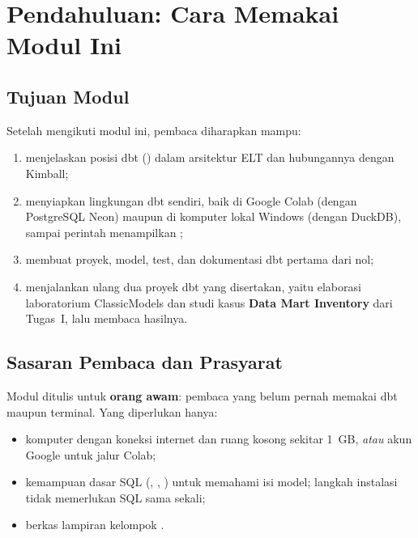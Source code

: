 \chapter*{Pendahuluan: Cara Memakai Modul Ini}

\section*{Tujuan Modul}
Setelah mengikuti modul ini, pembaca diharapkan mampu:
\begin{enumerate}[nosep]
    \item menjelaskan posisi dbt () dalam arsitektur ELT dan hubungannya dengan  Kimball;
    \item menyiapkan lingkungan dbt sendiri, baik di Google Colab (dengan PostgreSQL Neon) maupun di komputer lokal Windows (dengan DuckDB), sampai perintah  menampilkan ;
    \item membuat proyek, model, test, dan dokumentasi dbt pertama dari nol;
    \item menjalankan ulang dua proyek dbt yang disertakan, yaitu elaborasi laboratorium ClassicModels dan studi kasus \textbf{Data Mart Inventory} dari Tugas~I, lalu membaca hasilnya.
\end{enumerate}

\section*{Sasaran Pembaca dan Prasyarat}
Modul ditulis untuk \textbf{orang awam}: pembaca yang belum pernah memakai dbt maupun terminal. Yang diperlukan hanya:
\begin{itemize}[nosep]
    \item komputer dengan koneksi internet dan ruang kosong sekitar 1~GB, \emph{atau} akun Google untuk jalur Colab;
    \item kemampuan dasar SQL (, , ) untuk memahami isi model; langkah instalasi tidak memerlukan SQL sama sekali;
    \item berkas lampiran kelompok .
\end{itemize}

